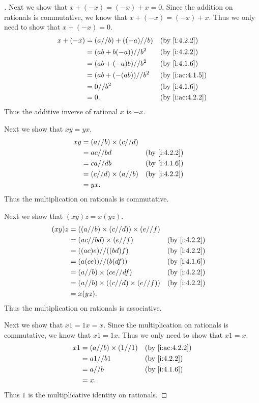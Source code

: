 \begin{proof}[]
  Next we show that \(x + (-x) = (-x) + x = 0\).
  Since the addition on rationals is commutative, we know that \(x + (-x) = (-x) + x\).
  Thus we only need to show that \(x + (-x) = 0\).
  \begin{align*}
    x + (-x) & = (a // b) + ((-a) // b) &  & \by{i:4.2.2}    \\
             & = (ab + b(-a)) // b^2    &  & \by{i:4.2.2}    \\
             & = (ab + (-a)b) // b^2    &  & \by{i:4.1.6}    \\
             & = (ab + (-(ab)) // b^2   &  & \by{i:ac:4.1.5} \\
             & = 0 // b^2               &  & \by{i:4.1.6}    \\
             & = 0.                     &  & \by{i:ac:4.2.2}
  \end{align*}
  Thus the additive inverse of rational \(x\) is \(-x\).

  Next we show that \(xy = yx\).
  \begin{align*}
    xy & = (a // b) \times (c // d)                   \\
       & = ac // bd                 &  & \by{i:4.2.2} \\
       & = ca // db                 &  & \by{i:4.1.6} \\
       & = (c // d) \times (a // b) &  & \by{i:4.2.2} \\
       & = yx.
  \end{align*}
  Thus the multiplication on rationals is commutative.

  Next we show that \((xy)z = x(yz)\).
  \begin{align*}
    (xy)z & = ((a // b) \times (c // d)) \times (e // f)                   \\
          & = (ac // bd) \times (e // f)                 &  & \by{i:4.2.2} \\
          & = ((ac)e) // ((bd)f)                         &  & \by{i:4.2.2} \\
          & = (a(ce)) // (b(df))                         &  & \by{i:4.1.6} \\
          & = (a // b) \times (ce // df)                 &  & \by{i:4.2.2} \\
          & = (a // b) \times ((c // d) \times (e // f)) &  & \by{i:4.2.2} \\
          & = x(yz).
  \end{align*}
  Thus the multiplication on rationals is associative.

  Next we show that \(x1 = 1x = x\).
  Since the multiplication on rationals is commutative, we know that \(x1 = 1x\).
  Thus we only need to show that \(x1 = x\).
  \begin{align*}
    x1 & = (a // b) \times (1 // 1) &  & \by{i:ac:4.2.2} \\
       & = a1 // b1                 &  & \by{i:4.2.2}    \\
       & = a // b                   &  & \by{i:4.1.6}    \\
       & = x.
  \end{align*}
  Thus \(1\) is the multiplicative identity on rationals.


\end{proof}
